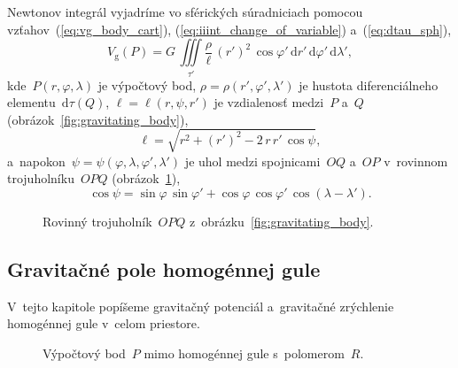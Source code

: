 \documentclass[a4paper, 12pt]{book}
\newcommand{\diff}{\mathrm d}
\newcommand{\gidx}{\mathrm g}
\begin{document}
Newtonov integrál vyjadríme vo sférických súradniciach pomocou 
vzťahov~(\ref{eq:vg_body_cart}), (\ref{eq:iiint_change_of_variable}) 
a~(\ref{eq:dtau_sph}),
%
\begin{equation}
\label{eq:vg_body_sph}
V_\gidx(P) = G \, \iiint\limits_{\tau'} \frac{\rho}{\ell} \, (r')^2 \, 
\cos\varphi' \, \diff r' \, \diff \varphi' \, \diff \lambda'{,}
\end{equation}
%
kde~$P(r, \varphi, \lambda)$ je výpočtový bod, $\rho = \rho(r', \varphi', 
\lambda')$ je hustota diferenciálneho elementu~$\diff\tau(Q)$, $\ell = \ell(r, 
\psi, r')$ je vzdialenosť medzi~$P$ a~$Q$ (obrázok~\ref{fig:gravitating_body}),
%
\begin{equation}
\label{eq:l_sph}
\ell = \sqrt{r^2 + (r')^2 - 2 \, r \, r' \, \cos\psi}{,}
\end{equation}
%
a~napokon~$\psi = \psi(\varphi, \lambda, \varphi', \lambda')$ je uhol medzi 
spojnicami~$OQ$ a~$OP$ v~rovinnom trojuholníku~$OPQ$ 
(obrázok~\ref{fig:distance_l}),
%
\begin{equation}
\label{eq:cospsi}
\cos\psi = \sin\varphi \, \sin\varphi' + \cos\varphi \, \cos\varphi' \,
\cos(\lambda - \lambda'){.}
\end{equation}

\begin{figure}
\centering

\caption{Rovinný trojuholník~$OPQ$ z~obrázku~\ref{fig:gravitating_body}.}
\label{fig:distance_l}
\end{figure}

\subsection{Gravitačné pole homogénnej gule}
\label{sec:homogeneous_ball_gravitational_field}

V~tejto kapitole popíšeme gravitačný potenciál a~gravitačné zrýchlenie 
homogénnej gule v~celom priestore.

\begin{figure}
\centering

\caption{Výpočtový bod~$P$ mimo homogénnej gule s~polomerom~$R$.}
\label{fig:homogeneous_ball_out}
\end{figure}
\end{document}
